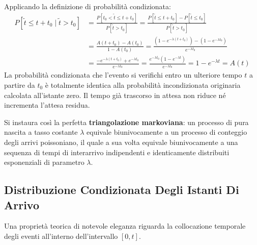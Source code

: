 \documentclass[11pt, a4paper]{article}
\begin{document}
Applicando la definizione di probabilità condizionata:
\begin{align*}
    P[\tilde{t} \le t + t_0 \mid \tilde{t} > t_0] &= \frac{P[t_0 < \tilde{t} \le t + t_0]}{P[\tilde{t} > t_0]} = \frac{P[\tilde{t} \le t + t_0] - P[\tilde{t} \le t_0]}{P[\tilde{t} > t_0]} \\
    &= \frac{A(t + t_0) - A(t_0)}{1 - A(t_0)} = \frac{\left(1 - e^{-\lambda(t + t_0)}\right) - \left(1 - e^{-\lambda t_0}\right)}{e^{-\lambda t_0}} \\
    &= \frac{-e^{-\lambda(t + t_0)} + e^{-\lambda t_0}}{e^{-\lambda t_0}} = \frac{e^{-\lambda t_0}\left(1 - e^{-\lambda t}\right)}{e^{-\lambda t_0}} = \boxed{1 - e^{-\lambda t} = A(t)}
\end{align*}
La probabilità condizionata che l'evento si verifichi entro un ulteriore tempo $t$ a partire da $t_0$ è totalmente identica alla probabilità incondizionata originaria calcolata all'istante zero. Il tempo già trascorso in attesa non riduce né incrementa l'attesa residua.


Si instaura così la perfetta \textbf{triangolazione markoviana}: un processo di pura nascita a tasso costante $\lambda$ equivale biunivocamente a un processo di conteggio degli arrivi poissoniano, il quale a sua volta equivale biunivocamente a una sequenza di tempi di interarrivo indipendenti e identicamente distribuiti esponenziali di parametro $\lambda$.

\subsection{Distribuzione Condizionata Degli Istanti Di Arrivo}

Una proprietà teorica di notevole eleganza riguarda la collocazione temporale degli eventi all'interno dell'intervallo $[0, t]$.

\end{document}
